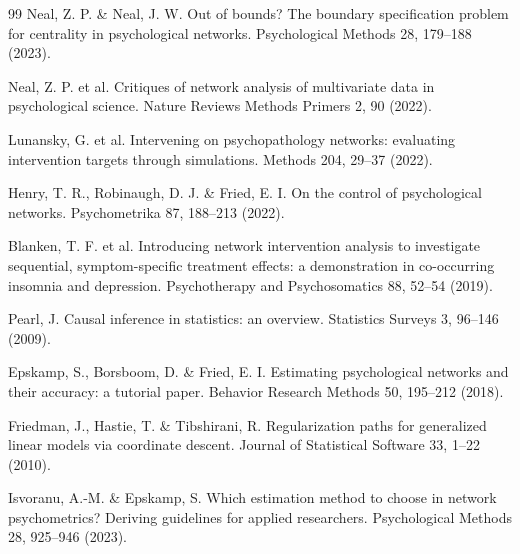 \documentclass[11pt]{article}
\begin{document}
\begin{thebibliography}{99}
 Neal, Z. P. \& Neal, J. W. Out of bounds? The boundary specification
problem for centrality in psychological networks. Psychological Methods
28, 179--188 (2023).

 Neal, Z. P. et al. Critiques of network analysis of multivariate
data in psychological science. Nature Reviews Methods Primers 2, 90
(2022).

 Lunansky, G. et al. Intervening on psychopathology networks:
evaluating intervention targets through simulations. Methods 204, 29--37
(2022).

 Henry, T. R., Robinaugh, D. J. \& Fried, E. I. On the control of
psychological networks. Psychometrika 87, 188--213 (2022).

 Blanken, T. F. et al. Introducing network intervention analysis to
investigate sequential, symptom-specific treatment effects: a
demonstration in co-occurring insomnia and depression. Psychotherapy and
Psychosomatics 88, 52--54 (2019).

 Pearl, J. Causal inference in statistics: an overview. Statistics
Surveys 3, 96--146 (2009).

 Epskamp, S., Borsboom, D. \& Fried, E. I. Estimating psychological
networks and their accuracy: a tutorial paper. Behavior Research Methods
50, 195--212 (2018).

 Friedman, J., Hastie, T. \& Tibshirani, R. Regularization paths for
generalized linear models via coordinate descent. Journal of Statistical
Software 33, 1--22 (2010).

 Isvoranu, A.-M. \& Epskamp, S. Which estimation method to choose in
network psychometrics? Deriving guidelines for applied researchers.
Psychological Methods 28, 925--946 (2023).
\end{thebibliography}
\end{document}
